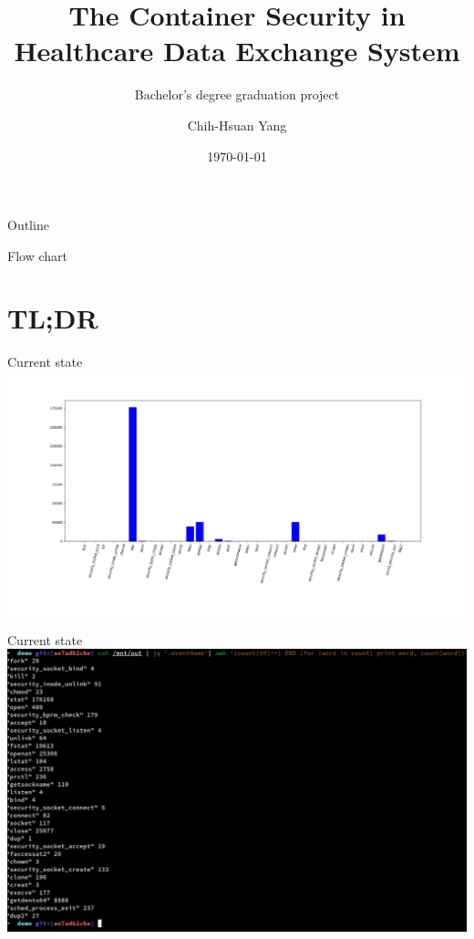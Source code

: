 \documentclass{beamer}
\title{The Container Security in Healthcare Data Exchange System}
\subtitle{Bachelor's degree graduation project}
\author{Chih-Hsuan Yang}
\institute{National Sun Yat-sen University\\
Advisor: Chun-I Fan
}
\date{\today}
\begin{document}
\begin{CJK*}{UTF8}{bsmi}

  \begin{frame}
    \titlepage
  \end{frame}


  \begin{frame}{Outline}
    \begin{multicols}{2}
      \tableofcontents
    \end{multicols}
  \end{frame}

  \begin{frame}{Flow chart}
    \centering
    \scalebox{0.9} {
    }
  \end{frame}

  \section{TL;DR}
  \begin{frame}{Current state}
    \includegraphics[width=\textwidth]{hist.png}
  \end{frame}

  \begin{frame}{Current state}
    \includegraphics[width=\textwidth]{photo_2021-09-10_14-04-18.jpg}
  \end{frame}


\end{CJK*}
\end{document}

